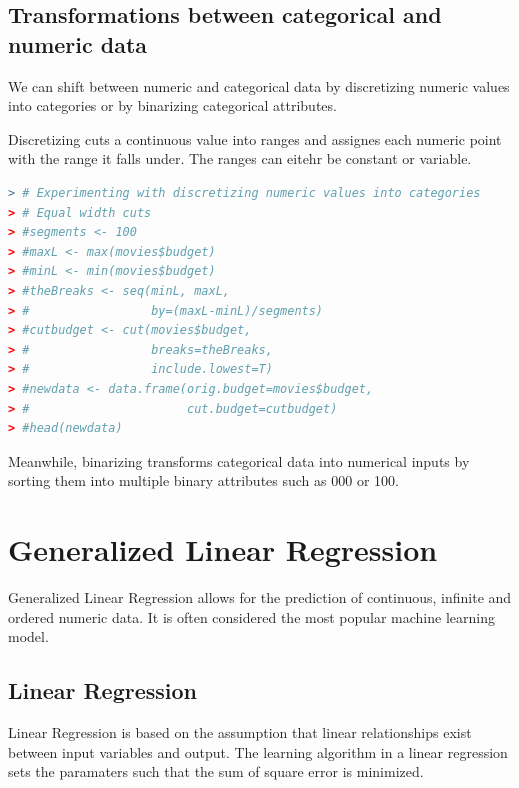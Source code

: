 \documentclass{article}
\begin{document}
\begin{spacing}{1.1}
\subsection{Transformations between categorical and numeric data}

We can shift between numeric and categorical data by discretizing numeric values into categories or by binarizing categorical attributes.  

\vspace{3mm}

Discretizing cuts a continuous value into ranges and assignes each numeric point with the range it falls under.  The ranges can eitehr be constant or variable.  

\vspace{3mm}

\begin{lstlisting}[language=R]
> # Experimenting with discretizing numeric values into categories
> # Equal width cuts
> #segments <- 100
> #maxL <- max(movies$budget)
> #minL <- min(movies$budget)
> #theBreaks <- seq(minL, maxL,
> #                 by=(maxL-minL)/segments)
> #cutbudget <- cut(movies$budget,
> #                 breaks=theBreaks,
> #                 include.lowest=T)
> #newdata <- data.frame(orig.budget=movies$budget,
> #                      cut.budget=cutbudget)
> #head(newdata)
\end{lstlisting}

\vspace{3mm}

Meanwhile, binarizing transforms categorical data into numerical inputs by sorting them into multiple binary attributes such as 000 or 100.  

\section{Generalized Linear Regression}

Generalized Linear Regression allows for the prediction of continuous, infinite and ordered numeric data.  It is often considered the most popular machine learning model. 


\subsection{Linear Regression}

Linear Regression is based on the assumption that linear relationships exist between input variables and output.  The learning algorithm in a linear regression sets the paramaters such that the sum of square error is minimized. 


\end{spacing}
\end{document}
